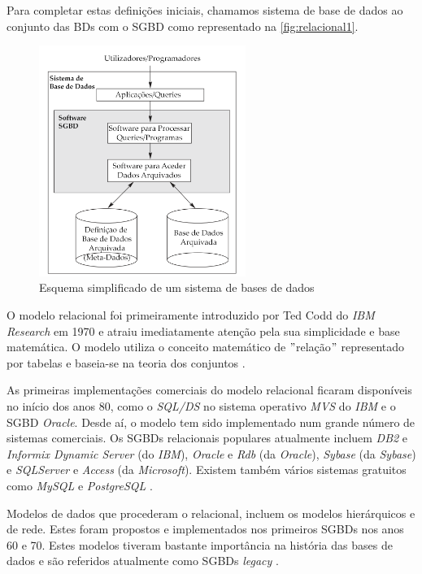 \documentclass[11pt,twoside,a4paper]{report}
\begin{document}
Para completar estas definições iniciais, chamamos sistema de base de dados ao conjunto das BDs com o SGBD como representado na \autoref{fig:relacional1}.
\begin{figure}[H]
	\begin{center}
		\includegraphics[width=0.6\textwidth]{SGBD} %
		\caption[Esquema de um sistema de bases de dados]{Esquema simplificado de um sistema de bases de dados \cite{Elmasri:2010:FDS:1855347}}
		\label{fig:relacional1}
	\end{center}
\end{figure}
O modelo relacional foi primeiramente introduzido por Ted Codd do \textit{IBM Research} em 1970 \cite{Elmasri:2010:FDS:1855347,Codd} e atraiu imediatamente atenção pela sua simplicidade e base matemática. O modelo utiliza o conceito matemático de $ " $relação$ " $ representado por tabelas e baseia-se na teoria dos conjuntos \cite{Elmasri:2010:FDS:1855347}.\par
As primeiras implementações comerciais do modelo relacional ficaram disponíveis no início dos anos 80, como o \textit{SQL/DS} no sistema operativo \textit{MVS} do \textit{IBM} e o SGBD \textit{Oracle}. Desde aí, o modelo tem sido implementado num grande número de sistemas comerciais. Os SGBDs relacionais populares atualmente incluem \textit{DB2} e \textit{Informix Dynamic Server} (do \textit{IBM}), \textit{Oracle} e \textit{Rdb} (da \textit{Oracle}), \textit{Sybase} (da \textit{Sybase}) e \textit{SQLServer} e \textit{Access} (da \textit{Microsoft}). Existem também vários sistemas gratuitos como \textit{MySQL} e \textit{PostgreSQL} \cite{Elmasri:2010:FDS:1855347}.\par
Modelos de dados que procederam o relacional, incluem os modelos hierárquicos e de rede. Estes foram propostos e implementados nos primeiros SGBDs nos anos 60 e 70. Estes modelos tiveram bastante importância na história das bases de dados e são referidos atualmente como SGBDs \textit{legacy} \cite{Elmasri:2010:FDS:1855347}.
\end{document}
